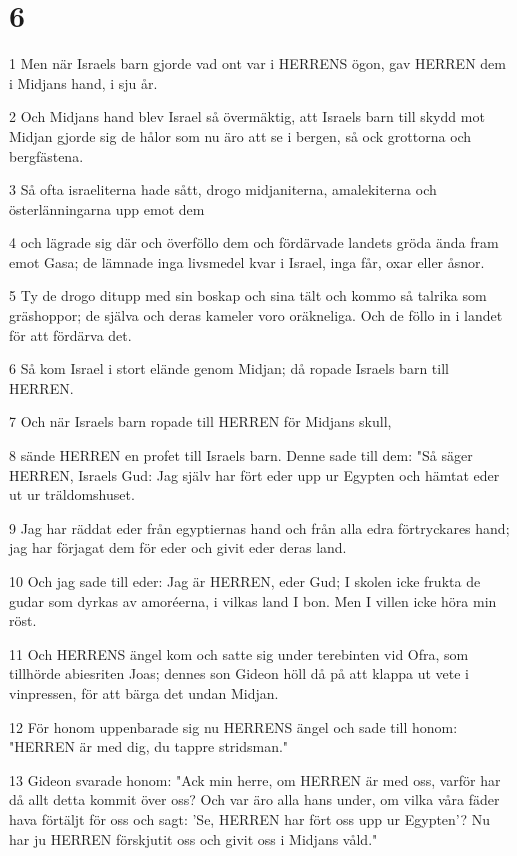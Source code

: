 \chapter{6}

\par 1 Men när Israels barn gjorde vad ont var i HERRENS ögon, gav HERREN dem i Midjans hand, i sju år.
\par 2 Och Midjans hand blev Israel så övermäktig, att Israels barn till skydd mot Midjan gjorde sig de hålor som nu äro att se i bergen, så ock grottorna och bergfästena.
\par 3 Så ofta israeliterna hade sått, drogo midjaniterna, amalekiterna och österlänningarna upp emot dem
\par 4 och lägrade sig där och överföllo dem och fördärvade landets gröda ända fram emot Gasa; de lämnade inga livsmedel kvar i Israel, inga får, oxar eller åsnor.
\par 5 Ty de drogo ditupp med sin boskap och sina tält och kommo så talrika som gräshoppor; de själva och deras kameler voro oräkneliga. Och de föllo in i landet för att fördärva det.
\par 6 Så kom Israel i stort elände genom Midjan; då ropade Israels barn till HERREN.
\par 7 Och när Israels barn ropade till HERREN för Midjans skull,
\par 8 sände HERREN en profet till Israels barn. Denne sade till dem: "Så säger HERREN, Israels Gud: Jag själv har fört eder upp ur Egypten och hämtat eder ut ur träldomshuset.
\par 9 Jag har räddat eder från egyptiernas hand och från alla edra förtryckares hand; jag har förjagat dem för eder och givit eder deras land.
\par 10 Och jag sade till eder: Jag är HERREN, eder Gud; I skolen icke frukta de gudar som dyrkas av amoréerna, i vilkas land I bon. Men I villen icke höra min röst.
\par 11 Och HERRENS ängel kom och satte sig under terebinten vid Ofra, som tillhörde abiesriten Joas; dennes son Gideon höll då på att klappa ut vete i vinpressen, för att bärga det undan Midjan.
\par 12 För honom uppenbarade sig nu HERRENS ängel och sade till honom: "HERREN är med dig, du tappre stridsman."
\par 13 Gideon svarade honom: "Ack min herre, om HERREN är med oss, varför har då allt detta kommit över oss? Och var äro alla hans under, om vilka våra fäder hava förtäljt för oss och sagt: 'Se, HERREN har fört oss upp ur Egypten'? Nu har ju HERREN förskjutit oss och givit oss i Midjans våld."
